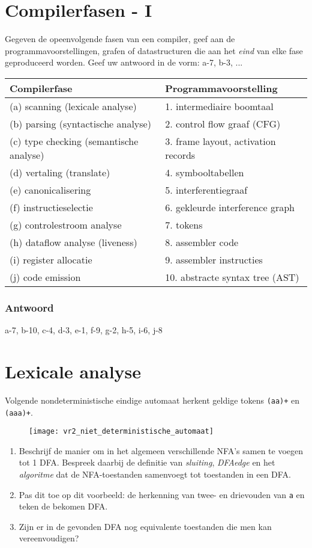 \documentclass{report}
\newcommand{\answer}[1]{
		\subsubsection*{Antwoord}
			#1
}
\begin{document}
\section{Compilerfasen - I}
	Gegeven de opeenvolgende fasen van een compiler, geef aan de programmavoorstellingen, grafen of datastructuren die aan het \textit{eind} van elke fase geproduceerd worden. Geef uw antwoord in de vorm: a-7, b-3, ...
	\begin{table}[ht]
		\begin{tabular}{l l}
			\hline
			Compilerfase & Programmavoorstelling \\
			\hline 
			(a) scanning (lexicale analyse) & 1.  intermediaire boomtaal \\
			(b) parsing  (syntactische analyse) & 2.  control flow graaf (CFG) \\
			(c) type checking (semantische analyse) & 3.  frame layout, activation records \\
			(d) vertaling (translate) & 4.  symbooltabellen \\
			(e) canonicalisering & 5.  interferentiegraaf \\
			(f) instructieselectie & 6.  gekleurde interference graph \\
			(g) controlestroom analyse & 7.  tokens \\
			(h) dataflow analyse (liveness) & 8.  assembler code \\
			(i) register allocatie & 9.  assembler instructies \\
			(j) code emission & 10.  abstracte syntax tree (AST)
		\end{tabular}
	\end{table}

	\answer{a-7, b-10, c-4, d-3, e-1, f-9, g-2, h-5, i-6, j-8}

	\newpage
	\section{Lexicale analyse}
	\label{sec:lexicale_analyse}
	
	Volgende nondeterministische eindige automaat herkent geldige tokens \texttt{(aa)+} en \texttt{(aaa)+}. 
	\begin{figure}[ht]
		\centering
		\texttt{[image: vr2\_niet\_deterministische\_automaat]}
	\end{figure}
	\begin{enumerate}
		\item Beschrijf de manier om in het algemeen verschillende NFA's samen te voegen tot 1 DFA. Bespreek daarbij de definitie van \textit{sluiting}, \textit{DFAedge} en het \textit{algoritme} dat de NFA-toestanden samenvoegt tot toestanden in een DFA.
		\item Pas dit toe op dit voorbeeld: de herkenning van twee- en drievouden van \texttt{a} en teken de bekomen DFA.
		\item Zijn er in de gevonden DFA nog equivalente toestanden die men kan vereenvoudigen?
	\end{enumerate}
\end{document}
